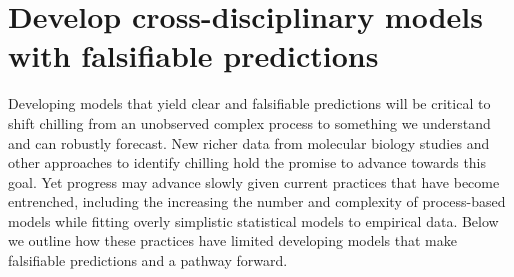 \documentclass[11pt]{article}
\begin{document}
\section*{Develop cross-disciplinary models with falsifiable predictions} 
Developing models that yield clear and falsifiable predictions will be critical to shift chilling from an unobserved complex process to something we understand and can robustly forecast. New richer data from molecular biology studies and other approaches to identify chilling \citep{fouche2023transport,walde2024stable} hold the promise to advance towards this goal. Yet progress may advance slowly given current practices that have become entrenched, including the increasing the number and complexity of process-based models while fitting overly simplistic statistical models to empirical data. Below we outline how these practices have limited developing  models that make falsifiable predictions and a pathway forward. 
\end{document}
